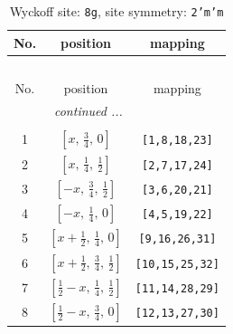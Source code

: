 \documentclass[fleqn,8pt]{jsarticle}
\begin{document}
\begin{longtable}{ccc}
\caption{Wyckoff site: {\tt 8g}, site symmetry: {\tt 2'm'm}}
 \\
 \hline \hline
No. & position & mapping \\ \hline \endfirsthead

\multicolumn{2}{l}{\tablename\ \thetable{}} \\
 \hline \hline
No. & position & mapping \\ \hline \endhead

 \hline \hline
\multicolumn{2}{r}{\footnotesize\it continued ...} \\ \endfoot

 \hline \hline
\multicolumn{2}{r}{} \\ \endlastfoot

1 & $\left[ x,\, \frac{3}{4},\, 0 \right]$ & {\tt [1,8,18,23]} \\ \hline
2 & $\left[ x,\, \frac{1}{4},\, \frac{1}{2} \right]$ & {\tt [2,7,17,24]} \\ \hline
3 & $\left[ - x,\, \frac{3}{4},\, \frac{1}{2} \right]$ & {\tt [3,6,20,21]} \\ \hline
4 & $\left[ - x,\, \frac{1}{4},\, 0 \right]$ & {\tt [4,5,19,22]} \\ \hline
5 & $\left[ x + \frac{1}{2},\, \frac{1}{4},\, 0 \right]$ & {\tt [9,16,26,31]} \\ \hline
6 & $\left[ x + \frac{1}{2},\, \frac{3}{4},\, \frac{1}{2} \right]$ & {\tt [10,15,25,32]} \\ \hline
7 & $\left[ \frac{1}{2} - x,\, \frac{1}{4},\, \frac{1}{2} \right]$ & {\tt [11,14,28,29]} \\ \hline
8 & $\left[ \frac{1}{2} - x,\, \frac{3}{4},\, 0 \right]$ & {\tt [12,13,27,30]} \\
\end{longtable}
\renewcommand{\arraystretch}{1.2}
\end{document}
